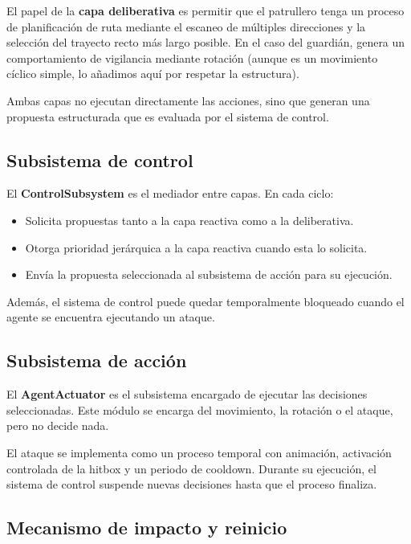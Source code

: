 \documentclass[a4paper,12pt]{article}
\begin{document}
El papel de la \textbf{capa deliberativa} es permitir que el patrullero tenga un proceso de planificación de ruta mediante el escaneo de múltiples direcciones y la selección del trayecto recto más largo posible. En el caso del guardián, genera un comportamiento de vigilancia mediante rotación (aunque es un movimiento cíclico simple, lo añadimos aquí por respetar la estructura).

Ambas capas no ejecutan directamente las acciones, sino que generan una propuesta estructurada que es evaluada por el sistema de control.

\subsection*{Subsistema de control}

El \textbf{ControlSubsystem} es el mediador entre capas. En cada ciclo:

\begin{itemize}
    \item Solicita propuestas tanto a la capa reactiva como a la deliberativa.
    \item Otorga prioridad jerárquica a la capa reactiva cuando esta lo solicita.
    \item Envía la propuesta seleccionada al subsistema de acción para su ejecución.
\end{itemize}

Además, el sistema de control puede quedar temporalmente bloqueado cuando el agente se encuentra ejecutando un ataque.

\subsection*{Subsistema de acción}

El \textbf{AgentActuator} es el subsistema encargado de ejecutar las decisiones seleccionadas. Este módulo se encarga del movimiento, la rotación o el ataque, pero no decide nada.

El ataque se implementa como un proceso temporal con animación, activación controlada de la hitbox y un periodo de cooldown. Durante su ejecución, el sistema de control suspende nuevas decisiones hasta que el proceso finaliza.

\subsection*{Mecanismo de impacto y reinicio}
\end{document}

